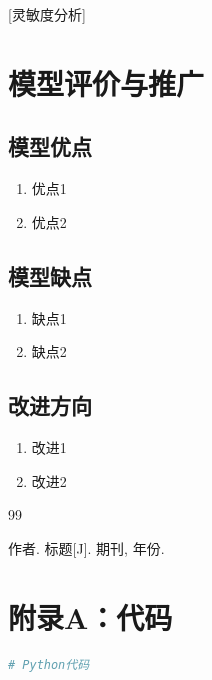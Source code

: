 \documentclass[12pt,a4paper]{article}
\begin{document}
[灵敏度分析]

\section{模型评价与推广}

\subsection{模型优点}
\begin{enumerate}
    \item 优点1
    \item 优点2
\end{enumerate}

\subsection{模型缺点}
\begin{enumerate}
    \item 缺点1
    \item 缺点2
\end{enumerate}

\subsection{改进方向}
\begin{enumerate}
    \item 改进1
    \item 改进2
\end{enumerate}

\begin{thebibliography}{99}

 作者. 标题[J]. 期刊, 年份.

\end{thebibliography}

\appendix
\section{附录A：代码}

\begin{lstlisting}[language=Python, caption={主要代码}]
# Python代码
\end{lstlisting}
\end{document}
